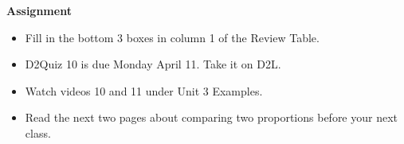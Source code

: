 
\begin{center}
  {\large\bf Assignment}
\end{center}

\begin{itemize}
\item Fill in the bottom 3 boxes in column 1 of the Review Table. 
\item D2Quiz 10 is due Monday April 11.  Take it on D2L.
\item Watch  videos 10 and 11 under Unit 3 Examples.
\item Read the next two pages about comparing two proportions before your next class.
\end{itemize}
